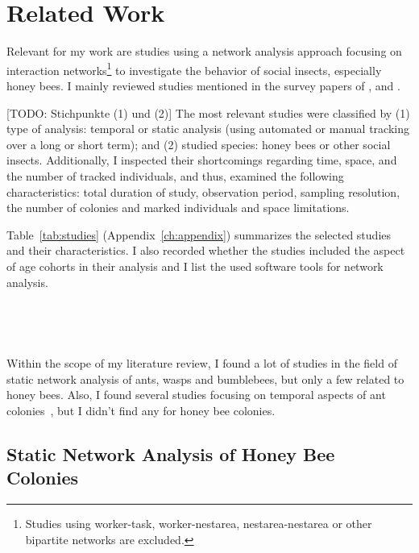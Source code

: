 \chapter{Related Work}
\label{ch:relatedwork}

Relevant for my work are studies using a network analysis approach focusing on interaction networks\footnote{Studies using worker-task, worker-nestarea, nestarea-nestarea or other bipartite networks are excluded.} to investigate the behavior of social insects, especially honey bees.
I mainly reviewed studies mentioned in the survey papers of \textcite{Pinter-Wollman2014}, \textcite[chapter~15]{krause2014animal} and \textcite{charbonneau2013social}.

[TODO: Stichpunkte (1) und (2)]
The most relevant studies were classified by (1) type of analysis: temporal or static analysis (using automated or manual tracking over a long or short term); and (2) studied species: honey bees or other social insects.
Additionally, I inspected their shortcomings regarding time, space, and the number of tracked individuals, and thus, examined the following characteristics: total duration of study, observation period, sampling resolution, the number of colonies and marked individuals and space limitations.

Table~\ref{tab:studies} (Appendix~\ref{ch:appendix}) summarizes the selected studies and their characteristics.
I also recorded whether the studies included the aspect of age cohorts in their analysis and I list the used software tools for network analysis.


~\cite{greenwald2015ant,pinter2011effect,otterstatter2007contact,quevillon2015social,naug2009structure,formica2012fitness,waters2012information,sendova2010emergency}

~\cite{baracchi2014socio,naug2008structure,scholl2011olfactory,naug2007experimentally}


Within the scope of my literature review, I found a lot of studies in the field of static network analysis of ants, wasps and bumblebees, but only a few related to honey bees.
Also, I found several studies focusing on temporal aspects of ant colonies~\cite{mersch2013tracking,blonder2011time,jeanson2012long}, but I didn't find any for honey bee colonies.


\section{Static Network Analysis of Honey Bee Colonies}

